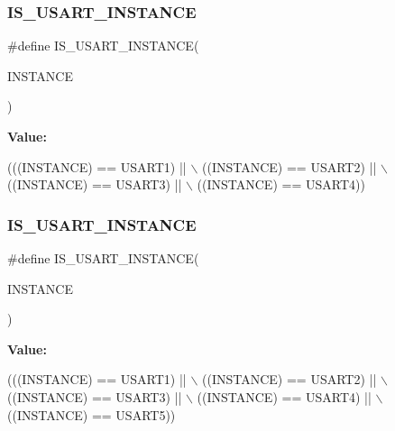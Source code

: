 \subsubsection{\texorpdfstring{I\+S\+\_\+\+U\+S\+A\+R\+T\+\_\+\+I\+N\+S\+T\+A\+N\+CE}{IS\_USART\_INSTANCE}\hspace{0.1cm}{\footnotesize\ttfamily [3/13]}}
{\footnotesize\ttfamily \#define I\+S\+\_\+\+U\+S\+A\+R\+T\+\_\+\+I\+N\+S\+T\+A\+N\+CE(\begin{DoxyParamCaption}\item[{}]{I\+N\+S\+T\+A\+N\+CE }\end{DoxyParamCaption})}

{\bfseries Value\+:}
\begin{DoxyCode}
(((INSTANCE) == USART1) || \(\backslash\)
                                     ((INSTANCE) == USART2) || \(\backslash\)
                                     ((INSTANCE) == USART3) || \(\backslash\)
                                     ((INSTANCE) == USART4))
\end{DoxyCode}
\mbox{\label{group___exported__macro_gafbce654f84a7c994817453695ac91cbe}} 
\subsubsection{\texorpdfstring{I\+S\+\_\+\+U\+S\+A\+R\+T\+\_\+\+I\+N\+S\+T\+A\+N\+CE}{IS\_USART\_INSTANCE}\hspace{0.1cm}{\footnotesize\ttfamily [4/13]}}
{\footnotesize\ttfamily \#define I\+S\+\_\+\+U\+S\+A\+R\+T\+\_\+\+I\+N\+S\+T\+A\+N\+CE(\begin{DoxyParamCaption}\item[{}]{I\+N\+S\+T\+A\+N\+CE }\end{DoxyParamCaption})}

{\bfseries Value\+:}
\begin{DoxyCode}
(((INSTANCE) == USART1) || \(\backslash\)
                                     ((INSTANCE) == USART2) || \(\backslash\)
                                     ((INSTANCE) == USART3) || \(\backslash\)
                                     ((INSTANCE) == USART4) || \(\backslash\)
                                     ((INSTANCE) == USART5))
\end{DoxyCode}
\mbox{\label{group___exported__macro_gafbce654f84a7c994817453695ac91cbe}} 
